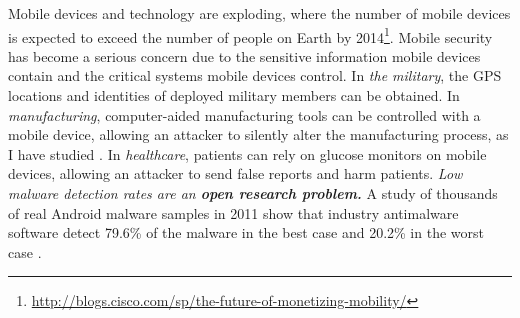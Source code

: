 \documentclass[12pt]{article}
\begin{document}
Mobile devices and technology are exploding,
where the number of mobile devices
is expected to exceed the number of people on Earth by
2014\footnote{\url{http://blogs.cisco.com/sp/the-future-of-monetizing-mobility/}}.
Mobile security has become a serious concern due to the sensitive
information mobile devices contain and the critical systems mobile
devices control. %
In {\it the military}, the GPS locations and identities of
deployed military members can be obtained.
In {\it manufacturing}, computer-aided manufacturing tools can be
controlled with a mobile device,
allowing an attacker to silently alter the manufacturing process,
as I have studied \cite{turner2013bad}.
In {\it healthcare}, patients can rely on glucose monitors on
mobile devices, allowing an attacker to send false reports and harm patients.
\textit{Low malware detection rates are an \textbf{open research problem.}}
A study of thousands of real Android malware samples in 2011 show
that industry antimalware software detect
79.6\% of the malware in the best case and
20.2\% in the worst case \cite{zhou2012dissecting}.

\newpage


\end{document}
